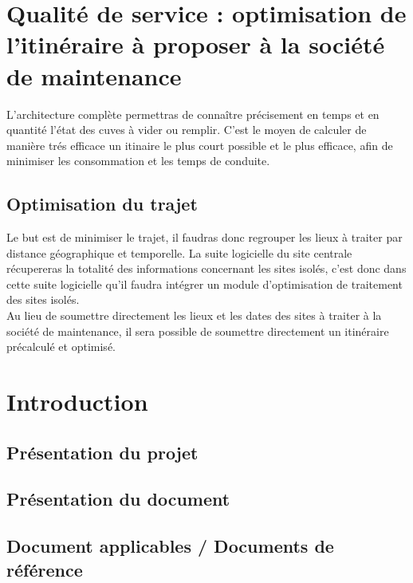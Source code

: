 
\section{Qualité de service : optimisation de l'itinéraire à proposer à la société de maintenance}

    L'architecture complète permettras de connaître précisement en temps et en quantité l'état des cuves à vider ou remplir.
    C'est le moyen de calculer de manière trés efficace un itinaire le plus court possible et le plus efficace, afin de minimiser les consommation et les temps de conduite.
    
    \subsection{Optimisation du trajet}
        
        Le but est de minimiser le trajet, il faudras donc regrouper les lieux à traiter par distance géographique et temporelle.
        La suite logicielle du site centrale récupereras la totalité des informations concernant les sites isolés, c'est donc dans cette suite logicielle qu'il faudra intégrer un module d'optimisation de traitement des sites isolés.
        \\
        Au lieu de soumettre directement les lieux et les dates des sites à traiter à la société de maintenance, il sera possible de soumettre directement un itinéraire précalculé et optimisé.
        
        

\section{Introduction}

    \subsection{Présentation du projet}
    
    \subsection{Présentation du document}
    
    \subsection{Document applicables / Documents de référence}
    
